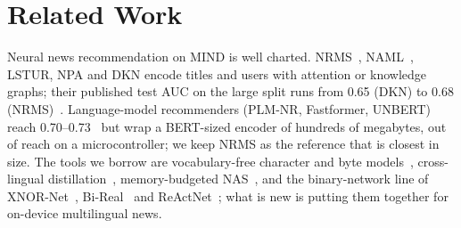\documentclass{llncs}
\begin{document}
\section{Related Work}
Neural news recommendation on MIND is well charted. NRMS~\cite{wu2019nrms},
NAML~\cite{wu2019naml}, LSTUR, NPA and DKN encode titles and
users with attention or knowledge graphs; their published test AUC on the large
split runs from 0.65 (DKN) to 0.68 (NRMS)~\cite{wu2020mind}. Language-model
recommenders (PLM-NR, Fastformer, UNBERT) reach 0.70--0.73~\cite{wu2023survey}
but wrap a BERT-sized encoder of hundreds of megabytes, out of reach on a
microcontroller; we keep NRMS as the reference that is closest in size.
The tools we borrow are vocabulary-free character and byte
models~\cite{zhang2015charcnn,gillick2016bytes,clark2022canine}, cross-lingual
distillation~\cite{reimers2020multilingual}, memory-budgeted
NAS~\cite{lin2020mcunet}, and the binary-network line of
XNOR-Net~\cite{rastegari2016xnor}, Bi-Real~\cite{liu2018bireal} and
ReActNet~\cite{liu2020reactnet}; what is new is putting them together for on-device
multilingual news.
\end{document}
